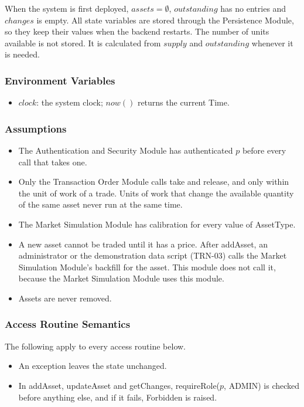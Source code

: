 \documentclass[12pt, titlepage]{article}
\begin{document}
\noindent When the system is first deployed, $\mathit{assets} = \emptyset$,
$\mathit{outstanding}$ has no entries and $\mathit{changes}$ is empty. All
state variables are stored through the Persistence Module, so they keep
their values when the backend restarts. The number of units available is not
stored. It is calculated from $\mathit{supply}$ and $\mathit{outstanding}$
whenever it is needed.

\subsubsection{Environment Variables}

\begin{itemize}
\item $\mathit{clock}$: the system clock; $\mathit{now}()$ returns the
  current Time.
\end{itemize}

\subsubsection{Assumptions}

\begin{itemize}
\item The Authentication and Security Module has authenticated $p$ before
  every call that takes one.
\item Only the Transaction Order Module calls take and release, and only
  within the unit of work of a trade. Units of work that change the
  available quantity of the same asset never run at the same time.
\item The Market Simulation Module has calibration for every value of
  AssetType.
\item A new asset cannot be traded until it has a price. After addAsset, an
  administrator or the demonstration data script (TRN-03) calls the Market
  Simulation Module's backfill for the asset. This module does not call it,
  because the Market Simulation Module uses this module.
\item Assets are never removed.
\end{itemize}

\subsubsection{Access Routine Semantics}

\noindent The following apply to every access routine below.
\begin{itemize}
\item An exception leaves the state unchanged.
\item In addAsset, updateAsset and getChanges, requireRole($p$,
  ADMIN) is checked before anything else, and if it fails, Forbidden is
  raised.
\end{itemize}
\end{document}
